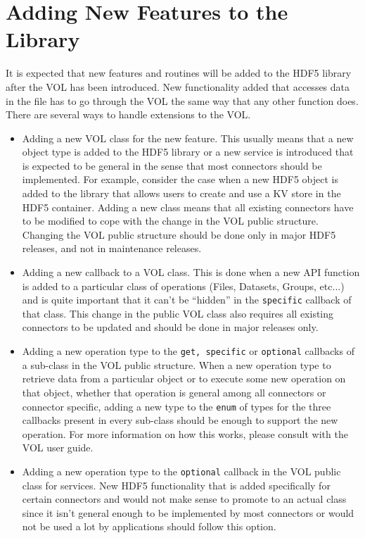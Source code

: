 
\section{Adding New Features to the Library}
It is expected that new features and routines will be added to the HDF5 library after the VOL has been introduced. New functionality added that accesses data in the file has to go through the VOL the same way that any other function does. There are several ways to handle extensions to the VOL.

\begin{itemize}
\item Adding a new VOL class for the new feature. This usually means that a new object type is added to the HDF5 library or a new service is introduced that is expected to be general in the sense that most connectors should be implemented. For example, consider the case when a new HDF5 object is added to the library that allows users to create and use a KV store in the HDF5 container. Adding a new class means that all existing connectors have to be modified to cope with the change in the VOL public structure. Changing the VOL public structure should be done only in major HDF5 releases, and not in maintenance releases.

\item Adding a new callback to a VOL class. This is done when a new API function is added to a particular class of operations (Files, Datasets, Groups, etc...) and is quite important that it can't be ``hidden'' in the {\tt specific} callback of that class. This change in the public VOL class also requires all existing connectors to be updated and should be done in major releases only.

\item Adding a new operation type to the {\tt get, specific} or {\tt optional} callbacks of a sub-class in the VOL public structure. When a new operation type to retrieve data from a particular object or to execute some new operation on that object, whether that operation is general among all connectors or connector specific, adding a new type to the {\tt enum} of types for the three callbacks present in every sub-class should be enough to support the new operation. For more information on how this works, please consult with the VOL user guide.

\item Adding a new operation type to the {\tt optional} callback in the VOL public class for services. New HDF5 functionality that is added specifically for certain connectors and would not make sense to promote to an actual class since it isn't general enough to be implemented by most connectors or would not be used a lot by applications should follow this option. 

\end{itemize}
